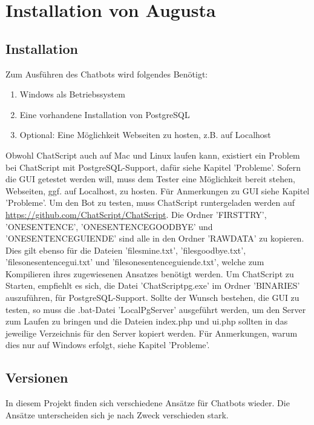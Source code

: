 \chapter{Installation von Augusta}
\label{sec:InstallationAugusta}

\section{Installation}
\label{sec:Installation}

Zum Ausführen des Chatbots wird folgendes Benötigt:

\begin{enumerate}
\item Windows als Betriebssystem
\item Eine vorhandene Installation von PostgreSQL
\item Optional: Eine Möglichkeit Webseiten zu hosten, z.B. auf Localhost
\end{enumerate}

Obwohl ChatScript auch auf Mac und Linux laufen kann, existiert ein Problem bei ChatScript mit PostgreSQL-Support, dafür siehe Kapitel 'Probleme'. Sofern die GUI getestet werden will, muss dem Tester eine Möglichkeit bereit stehen, Webseiten, ggf. auf Localhost, zu hosten. Für Anmerkungen zu GUI siehe Kapitel 'Probleme'. 
Um den Bot zu testen, muss ChatScript runtergeladen werden auf \url{https://github.com/ChatScript/ChatScript}. Die Ordner 'FIRSTTRY', 'ONESENTENCE', 'ONESENTENCEGOODBYE' und 'ONESENTENCEGUIENDE' sind alle in den Ordner 'RAWDATA' zu kopieren. Dies gilt ebenso für die Dateien 'filesmine.txt', 'filesgoodbye.txt', 'filesonesentencegui.txt' und 'filesonesentenceguiende.txt', welche zum Kompilieren ihres zugewiesenen Ansatzes benötigt werden. 
Um ChatScript zu Starten, empfiehlt es sich, die Datei 'ChatScriptpg.exe' im Ordner 'BINARIES' auszuführen, für PostgreSQL-Support. 
Sollte der Wunsch bestehen, die GUI zu testen, so muss die .bat-Datei 'LocalPgServer' ausgeführt werden, um den Server zum Laufen zu bringen und die Dateien index.php und ui.php sollten in das jeweilige Verzeichnis für den Server kopiert werden. 
Für Anmerkungen, warum dies nur auf Windows erfolgt, siehe Kapitel 'Probleme'. 

\section{Versionen}
\label{Versionen}

In diesem Projekt finden sich verschiedene Ansätze für Chatbots wieder. Die Ansätze unterscheiden sich je nach Zweck verschieden stark.

